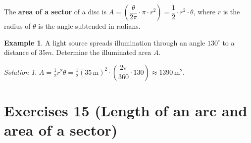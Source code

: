 \documentclass[
  12pt,
  oneside]{book}
\theoremstyle{definition}
\theoremstyle{definition}
\newtheorem{example}{Example}[chapter]
\theoremstyle{definition}
\theoremstyle{definition}
\theoremstyle{remark}
\newtheorem*{solution}{Solution}
\begin{document}
The \textbf{area of a sector} of a disc is \(A=\left(\dfrac{\theta}{2\pi}\cdot\pi\cdot r^2\right) = \dfrac{1}{2}\cdot r^2\cdot \theta\), where \(r\) is the radius of \(\theta\) is the angle subtended in radians.

\begin{example}
A light source spreads illumination through an angle \(130^\circ\) to a distance of \(35m\). Determine the illuminated area \(A\).
\end{example}

\begin{solution}
\(A=\frac12 r^2\theta = \frac12\left(35\,\mathrm{m}\right)^2\cdot\left(\dfrac{2\pi}{360}\cdot 130\right) \approx 1390\,\mathrm{m}^2\).
\end{solution}

\chapter*{Exercises 15 (Length of an arc and area of a sector)}\label{exercises-15-length-of-an-arc-and-area-of-a-sector}
\end{document}

